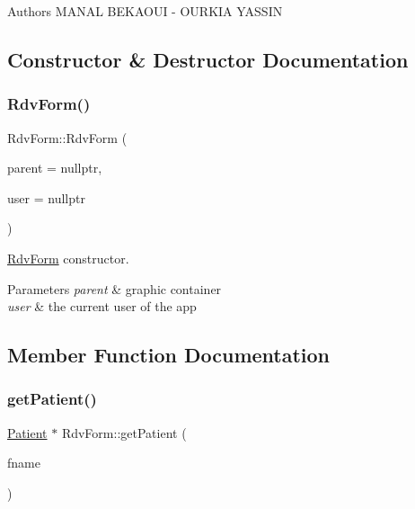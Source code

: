 \begin{DoxyAuthor}{Authors}
M\+A\+N\+AL B\+E\+K\+A\+O\+UI -\/ O\+U\+R\+K\+IA Y\+A\+S\+S\+IN 
\end{DoxyAuthor}


\subsection{Constructor \& Destructor Documentation}
\mbox{\label{class_rdv_form_a26f5f247bfffe65ca85e2f2e8d769c8a}} 
\subsubsection{\texorpdfstring{RdvForm()}{RdvForm()}}
{\footnotesize\ttfamily Rdv\+Form\+::\+Rdv\+Form (\begin{DoxyParamCaption}\item[{Q\+Widget $\ast$}]{parent = {\ttfamily nullptr},  }\item[{Q\+String}]{user = {\ttfamily nullptr} }\end{DoxyParamCaption})\hspace{0.3cm}{\ttfamily [explicit]}}



\mbox{\hyperlink{class_rdv_form}{Rdv\+Form}} constructor. 


\begin{DoxyParams}{Parameters}
{\em parent} & graphic container \\
\hline
{\em user} & the current user of the app \\
\hline
\end{DoxyParams}


\subsection{Member Function Documentation}
\mbox{\label{class_rdv_form_aee1f52f10a74e3c307e28d838408afda}} 
\subsubsection{\texorpdfstring{getPatient()}{getPatient()}}
{\footnotesize\ttfamily \mbox{\hyperlink{class_patient}{Patient}} $\ast$ Rdv\+Form\+::get\+Patient (\begin{DoxyParamCaption}\item[{Q\+String}]{fname }\end{DoxyParamCaption})}



